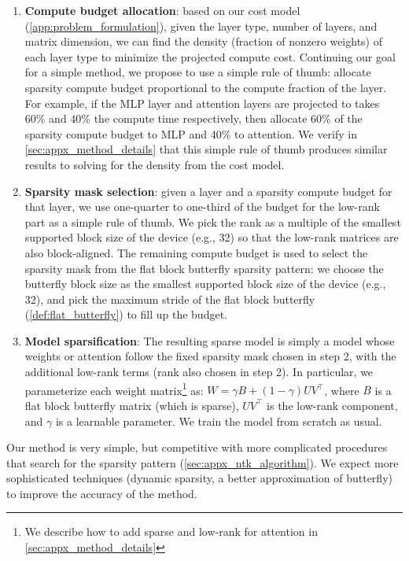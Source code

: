 \begin{enumerate}[leftmargin=*,nosep,nolistsep]
  \item \textbf{Compute budget allocation}: based on our cost model
  (\ref{app:problem_formulation}), given the layer type, number of layers, and matrix dimension, we can find the density (fraction of nonzero weights) of each layer type to minimize the projected compute cost. Continuing our goal for a simple method, we propose to use a simple rule of thumb: allocate sparsity compute budget proportional to the compute fraction of the layer. For example, if the MLP layer and attention layers are projected to takes 60\%
  and 40\% the compute time respectively, then allocate 60\% of the sparsity compute budget to MLP and 40\% to attention. We verify in \ref{sec:appx_method_details} that this simple rule of thumb produces similar results to solving for the density from the cost model.

  \item \textbf{Sparsity mask selection}: given a layer and a sparsity compute budget for that layer, we use one-quarter to one-third of the budget for the low-rank part as a simple rule of thumb. We pick the rank as a multiple of the smallest supported block size of the device (e.g., 32) so that the low-rank matrices are also block-aligned. The remaining compute budget is used to select the sparsity mask from the flat block butterfly sparsity pattern: we choose the butterfly block size as the smallest supported block size of the device (e.g., 32), and pick the maximum stride of the flat block butterfly (\ref{def:flat_butterfly}) to fill up the budget.

  \item \textbf{Model sparsification}: The resulting sparse model is simply a model whose weights or attention follow the fixed sparsity mask chosen in step 2, with the additional low-rank terms (rank also chosen in step 2). In particular, we parameterize each weight matrix\footnote{We describe how to add sparse and low-rank for attention in \ref{sec:appx_method_details}} as: $W = \gamma B + (1 - \gamma) U V^\top$, where $B$ is a flat block butterfly matrix (which is sparse), $U V^\top$ is the low-rank component, and $\gamma$
  is a learnable parameter. We train the model from scratch as usual.
\end{enumerate}

Our method is very simple, but competitive with more complicated procedures that search for the sparsity pattern (\ref{sec:appx_ntk_algorithm}).
We expect more sophisticated techniques (dynamic sparsity, a better approximation of butterfly) to improve the accuracy of the method.

